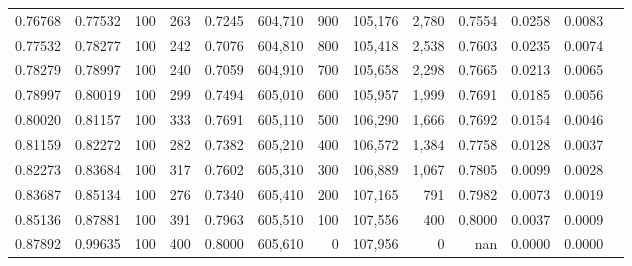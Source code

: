 \begin{tabular}{rrrrrrrrrrrrr}
0.76768 & 0.77532 &   100 & 263 &                                     0.7245 & 604,710 &     900 & 105,176 &   2,780 & 0.7554 & 0.0258 & 0.0083 \\
0.77532 & 0.78277 &   100 & 242 &                                     0.7076 & 604,810 &     800 & 105,418 &   2,538 & 0.7603 & 0.0235 & 0.0074 \\
0.78279 & 0.78997 &   100 & 240 &                                     0.7059 & 604,910 &     700 & 105,658 &   2,298 & 0.7665 & 0.0213 & 0.0065 \\
0.78997 & 0.80019 &   100 & 299 &                                     0.7494 & 605,010 &     600 & 105,957 &   1,999 & 0.7691 & 0.0185 & 0.0056 \\
0.80020 & 0.81157 &   100 & 333 &                                     0.7691 & 605,110 &     500 & 106,290 &   1,666 & 0.7692 & 0.0154 & 0.0046 \\
0.81159 & 0.82272 &   100 & 282 &                                     0.7382 & 605,210 &     400 & 106,572 &   1,384 & 0.7758 & 0.0128 & 0.0037 \\
0.82273 & 0.83684 &   100 & 317 &                                     0.7602 & 605,310 &     300 & 106,889 &   1,067 & 0.7805 & 0.0099 & 0.0028 \\
0.83687 & 0.85134 &   100 & 276 &                                     0.7340 & 605,410 &     200 & 107,165 &     791 & 0.7982 & 0.0073 & 0.0019 \\
0.85136 & 0.87881 &   100 & 391 &                                     0.7963 & 605,510 &     100 & 107,556 &     400 & 0.8000 & 0.0037 & 0.0009 \\
0.87892 & 0.99635 &   100 & 400 &                                     0.8000 & 605,610 &       0 & 107,956 &       0 &    nan & 0.0000 & 0.0000 \\
\bottomrule
\end{tabular}
